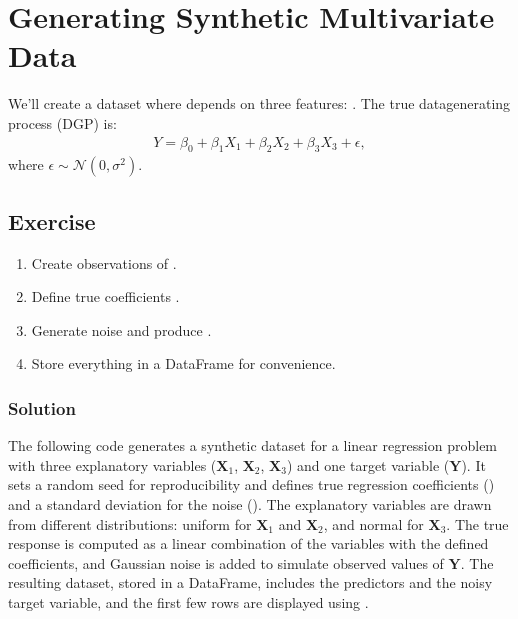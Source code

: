 \documentclass[letterpaper,10pt,english]{jupyterBook}
\begin{document}
\section{Generating Synthetic Multivariate Data}
\label{\detokenize{02:generating-synthetic-multivariate-data}}
\sphinxAtStartPar
We’ll create a dataset where  depends on three features: .
The true data\sphinxhyphen{}generating process (DGP) is:
\begin{equation*}
\begin{split}
  Y = \beta_0 + \beta_1 X_1 + \beta_2 X_2 + \beta_3 X_3 + \epsilon,
\end{split}
\end{equation*}
\sphinxAtStartPar
where \(\epsilon \sim \mathcal{N}(0, \sigma^2)\).


\subsection{Exercise}
\label{\detokenize{02:exercise}}\begin{enumerate}
%
\item {} 
\sphinxAtStartPar
Create  observations of .

\item {} 
\sphinxAtStartPar
Define true coefficients .

\item {} 
\sphinxAtStartPar
Generate noise and produce .

\item {} 
\sphinxAtStartPar
Store everything in a DataFrame for convenience.

\end{enumerate}


\subsubsection{Solution}
\label{\detokenize{02:solution}}
\sphinxAtStartPar
The following code generates a synthetic dataset for a linear regression problem with three explanatory variables (\(\mathbf X_1\), \(\mathbf X_2\), \(\mathbf X_3\)) and one target variable (\(\mathbf Y\)). It sets a random seed for reproducibility and defines true regression coefficients () and a standard deviation for the noise (). The explanatory variables are drawn from different distributions: uniform for \(\mathbf X_1\) and \(\mathbf X_2\), and normal for \(\mathbf X_3\). The true response  is computed as a linear combination of the variables with the defined coefficients, and Gaussian noise is added to simulate observed values of \(\mathbf Y\). The resulting dataset, stored in a  DataFrame, includes the predictors and the noisy target variable, and the first few rows are displayed using .
\end{document}
